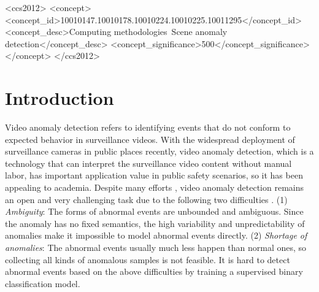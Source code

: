 \documentclass[sigconf]{acmart}
\begin{document}
\begin{CCSXML}
	<ccs2012>
	<concept>
	<concept_id>10010147.10010178.10010224.10010225.10011295</concept_id>
	<concept_desc>Computing methodologies~Scene anomaly detection</concept_desc>
	<concept_significance>500</concept_significance>
	</concept>
	</ccs2012>
\end{CCSXML}





\maketitle

\section{Introduction}
Video anomaly detection refers to identifying events that do not conform to expected behavior \cite{chandola2009anomaly} in surveillance videos. With the widespread deployment of surveillance cameras in public places recently, video anomaly detection, which is a technology that can interpret the surveillance video content without manual labor, has important application value in public safety scenarios, so it has been appealing to academia. Despite many efforts \cite{luo2017revisit, cong2011sparse, feng2016deep, liu2018future}, video anomaly detection remains an open and very challenging task due to the following two difficulties \cite{chandola2009anomaly}. (1) \emph{Ambiguity}: The forms of abnormal events are unbounded and ambiguous. Since the anomaly has no fixed semantics, the high variability and unpredictability of anomalies make it impossible to model abnormal events directly. (2) \emph{Shortage of anomalies}: The abnormal events usually much less happen than normal ones, so collecting all kinds of anomalous samples is not feasible. It is hard to detect abnormal events based on the above difficulties by training a supervised binary classification model.
\end{document}
